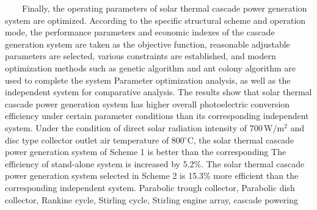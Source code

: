 {        Finally, the operating parameters of solar thermal cascade power generation system are optimized. According to the specific structural scheme and operation mode, the performance parameters and economic indexes of the cascade generation system are taken as the objective function, reasonable adjustable parameters are selected, various constraints are established, and modern optimization methods such as genetic algorithm and ant colony algorithm are used to complete the system Parameter optimization analysis, as well as the independent system for comparative analysis. The results show that solar thermal cascade power generation system has higher overall photoelectric conversion efficiency under certain parameter conditions than its corresponding independent system. Under the condition of direct solar radiation intensity of 700\,$\mathrm{W/m^2}$ and disc type collector outlet air temperature of 800$\mathrm{^\circ C}$, the solar thermal cascade power generation system of Scheme 1 is better than the corresponding The efficiency of stand-alone system is increased by 5.2\%. The solar thermal cascade power generation system selected in Scheme 2 is 15.3\% more efficient than the corresponding independent system.
}
\enkeywords
{Parabolic trough collector, Parabolic dish collector, Rankine cycle, Stirling cycle, Stirling engine array, cascade powering}